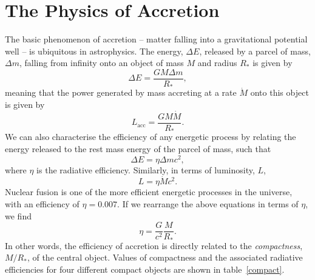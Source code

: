 \section{The Physics of Accretion}

The basic phenomenon of accretion -- 
matter falling into a gravitational potential well -- 
is ubiquitous in astrophysics. The energy, $\Delta E$, released by a parcel of 
mass, $\Delta m$, falling from infinity onto an object of mass $M$ and radius $R_*$
is given by
\begin{equation}
\Delta E = \frac{GM \Delta m}{R_*},
\label{eq:acc_energy}
\end{equation} 
meaning that the power generated by mass accreting at a rate $\dot{M}$ onto this
object is given by
\begin{equation}
L_{\mathrm{acc}} = \frac{GM \dot{M}}{R_*}.
\label{eq:acc_energy}
\end{equation} 
We can also characterise the efficiency of any energetic process by relating
the energy released to the rest mass energy of the parcel of mass, such that
\begin{equation}
\Delta E = \eta \Delta m c^2,
\label{eq:restmass}
\end{equation} 
where $\eta$ is the radiative efficiency. Similarly, in terms of luminosity, $L$,
\begin{equation}
L = \eta \dot{M} c^2.
\label{eq:restmass2}
\end{equation} 
Nuclear fusion is one of the more efficient
energetic processes in the universe, with an efficiency of
$\eta=0.007$. If we rearrange the above equations in terms of $\eta$, we find
\begin{equation}
\eta = \frac{G}{c^2} \frac{M}{R_*}.
\label{eq:eta}
\end{equation} 
In other words, the efficiency of accretion is directly related 
to the {\em compactness}, $M/R_*$, of the central object. 
Values of compactness and the associated radiative efficiencies 
for four different compact objects are shown in table~\ref{compact}. 

